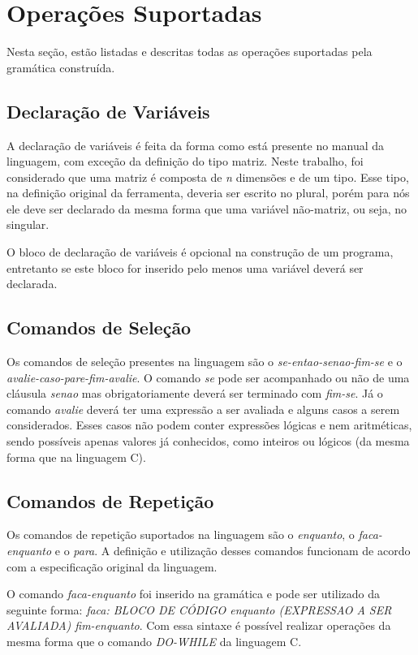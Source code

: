 \documentclass[
12pt,				%
a4paper,			%
english,			%
french,				%
spanish,			%
brazil,				%
article
]{abntex2}
\begin{document}
\section{Operações Suportadas}
Nesta seção, estão listadas e descritas todas as operações suportadas pela gramática construída.
\subsection{Declaração de Variáveis}
A declaração de variáveis é feita da forma como está presente no manual da linguagem, com exceção da definição do tipo matriz. Neste trabalho, foi considerado que uma matriz é composta de \textit{n} dimensões e de um tipo. Esse tipo, na definição original da ferramenta, deveria ser escrito no plural, porém para nós ele deve ser declarado da mesma forma que uma variável não-matriz, ou seja, no singular.

O bloco de declaração de variáveis é opcional na construção de um programa, entretanto se este bloco for inserido pelo menos uma variável deverá ser declarada.


\subsection{Comandos de Seleção}
Os comandos de seleção presentes na linguagem são o \textit{se-entao-senao-fim-se} e o \textit{avalie-caso-pare-fim-avalie}.
O comando \textit{se} pode ser acompanhado ou não de uma cláusula \textit{senao} mas obrigatoriamente deverá ser terminado com \textit{fim-se}. Já o comando \textit{avalie} deverá ter uma expressão a ser avaliada e alguns casos a serem considerados. Esses casos não podem conter expressões lógicas e nem aritméticas, sendo possíveis apenas valores já conhecidos, como inteiros ou lógicos (da mesma forma que na linguagem C).

\subsection{Comandos de Repetição}
Os comandos de repetição suportados na linguagem são o \textit{enquanto}, o \textit{faca-enquanto} e o \textit{para}. A definição e utilização desses comandos funcionam de acordo com a especificação original da linguagem.

O comando \textit{faca-enquanto} foi inserido na gramática e pode ser utilizado da seguinte forma:
\textit{faca: BLOCO DE CÓDIGO enquanto (EXPRESSAO A SER AVALIADA) fim-enquanto}. Com essa sintaxe é possível realizar operações da mesma forma que o comando \textit{DO-WHILE} da linguagem C. 
\end{document}
